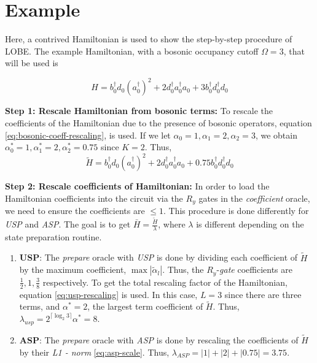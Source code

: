 \section{Example}
\label{subsec:example}
Here, a contrived Hamiltonian is used to show the step-by-step procedure of LOBE. The example Hamiltonian, with a bosonic occupancy cutoff $\Omega = 3$, that will be used is 

\begin{equation}
    \label{eq:example-ham}
    H = b_0^\dagger d_0(a_0^\dagger)^2 + 2 d_0^\dagger a_0^\dagger a_0+3 b_0^\dagger d_0^\dagger d_0
\end{equation}

\textbf{Step 1: Rescale Hamiltonian from bosonic terms:}
To rescale the coefficients of the Hamiltonian due to the presence of bosonic operators, equation \ref{eq:bosonic-coeff-rescaling}, is used. If we let $\alpha_0 = 1, \alpha_1 = 2, \alpha_2 = 3$, we obtain  $\alpha_0^* = 1,\alpha_1^* = 2, \alpha_2^* = 0.75$ since $K = 2$. Thus,
\begin{equation}
    \tilde{H} = b_0^\dagger d_0(a_0^\dagger)^2 + 2 d_0^\dagger a_0^\dagger a_0+0.75 b_0^\dagger d_0^\dagger d_0
\end{equation}

\textbf{Step 2: Rescale coefficients of Hamiltonian:} In order to load the Hamiltonian coefficients into the circuit via the $R_y$ gates in the \textit{coefficient} oracle, we need to ensure the coefficients are $\leq 1$. This procedure is done differently for \textit{USP} and \textit{ASP}. The goal is to get $\bar{H} = \frac{\tilde{H}}{\lambda}$, where $\lambda$ is different depending on the state preparation routine.
\begin{enumerate}
    \item \textbf{USP}: The \textit{prepare} oracle with \textit{USP} is done by dividing each coefficient of $\tilde{H}$ by the maximum coefficient, $\max{|\tilde{\alpha}_l|}$. Thus, the $R_y$-\textit{gate} coefficients are $\frac{1}{2}, 1, \frac{3}{8}$ respectively. To get the total rescaling factor of the Hamiltonian, equation \ref{eq:usp-rescaling} is used. In this case, $L = 3$ since there are three terms, and $\alpha^* = 2$, the largest term coefficient of $\tilde{H}$. Thus, $\lambda_{usp} = 2^{\lceil \log_2{3} \rceil}\alpha^* = 8$. 
    \item \textbf{ASP}: The \textit{prepare} oracle with \textit{ASP} is done by rescaling the coefficients of $\tilde{H}$ by their \textit{L1 - norm} \ref{eq:asp-scale}. Thus, $\lambda_{ASP} = |1| + |2| + |0.75| = 3.75$.
\end{enumerate}

